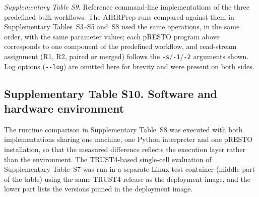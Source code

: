 \documentclass[11pt]{article}
\begin{document}
{\small\textit{Supplementary Table S9.}
Reference command-line implementations of the three predefined bulk workflows.
The AIRRPrep runs compared against them in Supplementary Tables~S3--S5
and~S8 used the same operations, in the same order, with the same parameter
values; each pRESTO program above corresponds to one component of the
predefined workflow, and read-stream assignment (R1, R2, paired or merged)
follows the
\texttt{-s}/\texttt{-1}/\texttt{-2} arguments shown. Log options
(\texttt{-{}-log}) are omitted here for brevity and were present on both sides.\par}


\clearpage
\begin{landscape}
\section*{Supplementary Table S10. Software and hardware environment}

The runtime comparison in Supplementary Table~S8 was executed with both
implementations sharing one machine, one Python interpreter and one pRESTO
installation, so that the measured difference reflects the execution layer
rather than the environment. The TRUST4-based single-cell evaluation of
Supplementary Table~S7 was run in a separate Linux test container (middle part
of the table) using the same TRUST4 release as the deployment image, and the
lower part lists the versions pinned in the deployment image.


\end{landscape}
\end{document}
